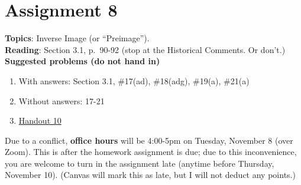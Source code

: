\documentclass[12pt]{article}
\begin{document}
\newpage
\section[8 (due November 8): Inverse Image (or ``Preimage'').]{Assignment 8}

\textbf{Topics}: Inverse Image (or ``Preimage'').
\\

\noindent \textbf{Reading}: Section 3.1, p.~90-92 (stop at the Historical Comments. Or don't.)
\\



\noindent \textbf{Suggested problems (do not hand in)}

\begin{enumerate}
\item With answers: Section 3.1, \#17(ad), \#18(adg), \#19(a), \#21(a)
\item Without answers: 17-21
\item \href{https://www.math.emory.edu/~dzb/teaching/250Fall2021/handouts/250-H10-preimages.pdf}{Handout 10}
\end{enumerate}

\noindent Due to a conflict, \textbf{office hours} will be 4:00-5pm on Tuesday, November 8 (over Zoom). This is after the homework assignment is due; due to this inconvenience, you are welcome to turn in the assignment late (anytime before Thursday, November 10). (Canvas will mark this as late, but I will not deduct any points.) 
\\
\end{document}

